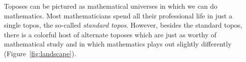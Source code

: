 \documentclass[oneside,reqno]{amsart}
\theoremstyle{definition}
\theoremstyle{plain}
\theoremstyle{remark}
\renewcommand{\_}{\mathpunct{.}\,}
\newcommand{\?}{\,{:}\,}
\begin{document}

\thispagestyle{empty}

\begin{center}
\end{center}
\bigskip

\noindent
Toposes can be pictured as mathematical universes in which we can do
mathematics. Most mathematicians spend all their professional life in just a
single topos, the so-called \emph{standard topos}. However, besides the
standard topos, there is a colorful host of alternate toposes which are just as
worthy of mathematical study and in which mathematics plays out slightly
differently (Figure~\ref{fig:landscape}).
\end{document}
